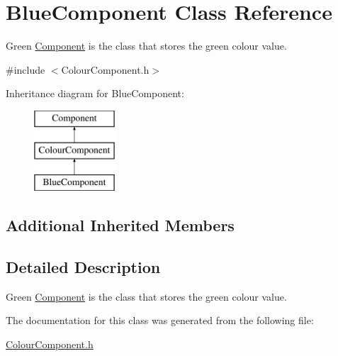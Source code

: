 \hypertarget{class_blue_component}{}\section{Blue\+Component Class Reference}
\label{class_blue_component}


Green \mbox{\hyperlink{class_component}{Component}} is the class that stores the green colour value.  




{\ttfamily \#include $<$Colour\+Component.\+h$>$}

Inheritance diagram for Blue\+Component\+:\begin{figure}[H]
\begin{center}
\leavevmode
\includegraphics[height=3.000000cm]{class_blue_component}
\end{center}
\end{figure}
\subsection*{Additional Inherited Members}


\subsection{Detailed Description}
Green \mbox{\hyperlink{class_component}{Component}} is the class that stores the green colour value. 

The documentation for this class was generated from the following file\+:\begin{DoxyCompactItemize}
\item 
\mbox{\hyperlink{_colour_component_8h}{Colour\+Component.\+h}}\end{DoxyCompactItemize}
